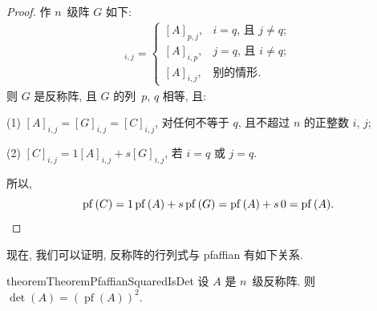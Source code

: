 \documentclass[../libro.tex]{subfiles}
\begin{document}
\begin{proof}
    作 \(n\)~级阵 \(G\) 如下:
    \begin{align*}
        [G]_{i,j} =
        \begin{cases}
            [A]_{p,j}, & \text{\(i = q\), 且 \(j \neq q\)}; \\
            [A]_{i,p}, & \text{\(j = q\), 且 \(i \neq q\)}; \\
            [A]_{i,j}, & \text{别的情形}.
        \end{cases}
    \end{align*}
    则 \(G\) 是反称阵,
    且 \(G\) 的列~\(p\), \(q\) 相等,
    且:

    (1)
    \([A]_{i,j} = [G]_{i,j} = [C]_{i,j}\),
    对任何不等于 \(q\), 且不超过 \(n\) 的正整数 \(i\), \(j\);

    (2)
    \([C]_{i,j} = 1[A]_{i,j} + s[G]_{i,j}\),
    若 \(i = q\) 或 \(j = q\).

    所以,
    \begin{equation*}
        \operatorname{pf} {(C)}
        =
        1 \operatorname{pf} {(A)} + s \operatorname{pf} {(G)}
        =
        \operatorname{pf} {(A)} + s \, 0
        =
        \operatorname{pf} {(A)}.
        \qedhere
    \end{equation*}
\end{proof}

现在, 我们可以证明,
反称阵的行列式与 pfaffian 有如下关系.

\begin{restatable}{theorem}{TheoremPfaffianSquaredIsDet}
    设 \(A\) 是 \(n\)~级反称阵.
    则 \(\det {(A)}
    = (\operatorname{pf} {(A)})^2\).
\end{restatable}
\end{document}
